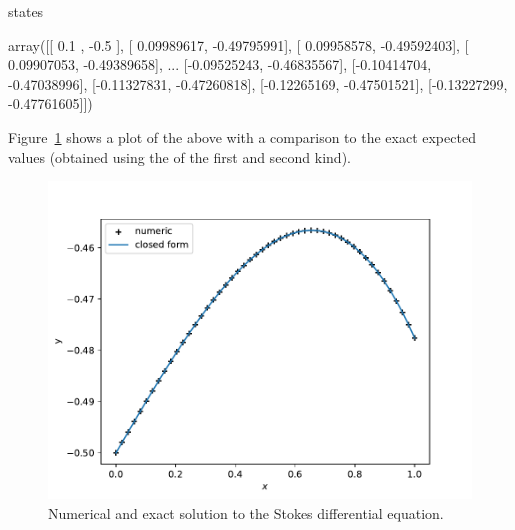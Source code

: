 \begin{pyin}
states
\end{pyin}





\begin{raw}
array([[ 0.1       , -0.5       ],
       [ 0.09989617, -0.49795991],
       [ 0.09958578, -0.49592403],
       [ 0.09907053, -0.49389658],
       ...
       [-0.09525243, -0.46835567],
       [-0.10414704, -0.47038996],
       [-0.11327831, -0.47260818],
       [-0.12265169, -0.47501521],
       [-0.13227299, -0.47761605]])
\end{raw}






Figure~\ref{fig:odeint_comparison_plot} shows a plot of the above with a comparison to the exact expected values (obtained
using the  of the first and second kind).


\begin{figure}[!htbp]
\begin{center}
\includegraphics[width=.7\textwidth]{./assets/odeint_comparison_plot/main.pdf}
    \caption{Numerical and exact solution to the Stokes differential equation.}
    \label{fig:odeint_comparison_plot}
\end{center}
\end{figure}
